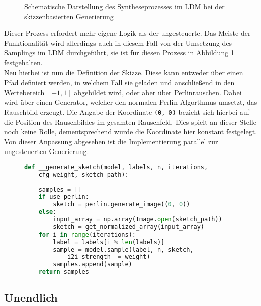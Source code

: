 \begin{figure}[htbp]
    \centering
    \caption{Schematische Darstellung des Syntheseprozesses im \ac{LDM} bei der skizzenbasierten Generierung}
    \label{fig:sketch}
\end{figure}
Dieser Prozess erfordert mehr eigene Logik als der ungesteuerte. Das Meiste der Funktionalität wird allerdings auch in diesem Fall von der Umsetzung des Samplings im \ac{LDM} durchgeführt, sie ist für diesen Prozess in Abbildung \ref{fig:sketch} festgehalten. \\
Neu hierbei ist nun die Definition der Skizze. Diese kann entweder über einen Pfad definiert werden, in welchem Fall sie geladen und anschließend in den Wertebereich $[-1,1]$ abgebildet wird, oder aber über Perlinrauschen. Dabei wird über einen Generator, welcher den normalen Perlin-Algorthmus umsetzt, das Rauschbild erzeugt. Die Angabe der Koordinate \texttt{(0, 0)} bezieht sich hierbei auf die Position des Rauschbildes im gesamten Rauschfeld. Dies spielt an dieser Stelle noch keine Rolle, dementsprechend wurde die Koordinate hier konstant festgelegt. Von dieser Anpassung abgesehen ist die Implementierung parallel zur ungesteuerten Generierung.
\begin{figure}[htbp]
\begin{lstlisting}[language=python]
def __generate_sketch(model, labels, n, iterations,
    cfg_weight, sketch_path):
    
    samples = []
    if use_perlin:
        sketch = perlin.generate_image((0, 0))
    else:
        input_array = np.array(Image.open(sketch_path))
        sketch = get_normalized_array(input_array)
    for i in range(iterations):
        label = labels[i % len(labels)]
        sample = model.sample(label, n, sketch,
            i2i_strength  = weight)
        samples.append(sample)
    return samples
\end{lstlisting}
    \captionsetup{type=figure}
    \label{fig:gen_sketch}
\end{figure}

\subsection {Unendlich}


